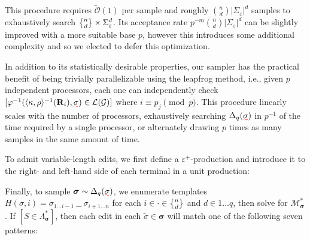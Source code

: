 \documentclass[sigplan,review,anonymous,acmsmall]{acmart}\settopmatter{printfolios=false,printccs=false,printacmref=false}
\begin{document}
This procedure requires $\widetilde{\mathcal O}(1)$ per sample and roughly ${n \choose d}|\Sigma_\varepsilon|^{d}$ samples to exhaustively search $\stirlingii{n}{d}\times\Sigma_\varepsilon^{d}$. Its acceptance rate $p^{-m}{n \choose d}|\Sigma_\varepsilon|^{d}$ can be slightly improved with a more suitable base $p$, however this introduces some additional complexity and so we elected to defer this optimization.

In addition to its statistically desirable properties, our sampler has the practical benefit of being trivially parallelizable using the leapfrog method, i.e., given $p$ independent processors, each one can independently check $[\varphi^{-1}(\langle\kappa, \rho\rangle^{-1}(\mathbf{R}_{i}), \err{\sigma}) \in \mathcal{L}(\mathcal{G})]$ where $i \equiv p_j \pmod p$. This procedure linearly scales with the number of processors, exhaustively searching $\Delta_{q}(\err{\sigma})$ in $p^{-1}$ of the time required by a single processor, or alternately drawing $p$ times as many samples in the same amount of time.

To admit variable-length edits, we first define a $\varepsilon^+$-production and introduce it to the right- and left-hand side of each terminal in a unit production:\vspace{5pt}


Finally, to sample $\bm{\sigma}\sim\Delta_{q}(\err{\sigma})$, we enumerate templates $H(\sigma, i) = \sigma_{1\ldots i-1}\:\text{\_ \_}\:\sigma_{i+1\ldots n}$ for each $i \in \cdot \in \stirlingii{n}{d}$ and $d \in 1\ldots q$, then solve for $\mathcal{M}_{\bm\sigma}^*$. If $[S \in \Lambda^*_{\bm\sigma}]$, then each edit in each $\tilde{\sigma} \in \bm\sigma$ will match one of the following seven patterns:\vspace{-10pt}
\end{document}
